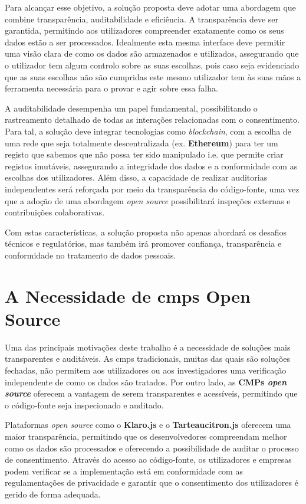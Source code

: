 Para alcançar esse objetivo, a solução proposta deve adotar uma abordagem que combine transparência, auditabilidade e eficiência. A transparência deve ser garantida, permitindo aos utilizadores compreender exatamente como os seus dados estão a ser processados. Idealmente esta mesma interface deve permitir uma visão clara de como os dados são armazenados e utilizados, assegurando que o utilizador tem algum controlo sobre as suas escolhas, pois caso seja evidenciado que as suas escolhas não são cumpridas este mesmo utilizador tem às suas mãos a ferramenta necessária para o provar e agir sobre essa falha.

A auditabilidade desempenha um papel fundamental, possibilitando o rastreamento detalhado de todas as interações relacionadas com o consentimento. Para tal, a solução deve integrar tecnologias como \textit{\textit{blockchain}}, com a escolha de uma  rede que seja totalmente descentralizada (ex. \textbf{Ethereum}) para ter um registo que sabemos que não possa ter sido manipulado i.e. que permite criar registos imutáveis, assegurando a integridade dos dados e a conformidade com as escolhas dos utilizadores. Além disso, a capacidade de realizar auditorias independentes será reforçada por meio da transparência do código-fonte, uma vez que a adoção de uma abordagem \textit{open source} possibilitará inspeções externas e contribuições colaborativas.

Com estas características, a solução proposta não apenas abordará os desafios técnicos e regulatórios, mas também irá promover confiança, transparência e conformidade no tratamento de dados pessoais.

\section{A Necessidade de \acrshort{cmp}s Open Source}

Uma das principais motivações deste trabalho é a necessidade de soluções mais transparentes e auditáveis. As \acrshort{cmp}s tradicionais, muitas das quais são soluções fechadas, não permitem aos utilizadores ou aos investigadores uma verificação independente de como os dados são tratados. Por outro lado, as \textbf{CMPs \textit{open source}} oferecem a vantagem de serem transparentes e acessíveis, permitindo que o código-fonte seja inspecionado e auditado.

Plataformas \textit{open source} como o \textbf{Klaro.js} e o \textbf{Tarteaucitron.js} oferecem uma maior transparência, permitindo que os desenvolvedores compreendam melhor como os dados são processados e oferecendo a possibilidade de auditar o processo de consentimento. Através do acesso ao código-fonte, os utilizadores e empresas podem verificar se a implementação está em conformidade com as regulamentações de privacidade e garantir que o consentimento dos utilizadores é gerido de forma adequada.

